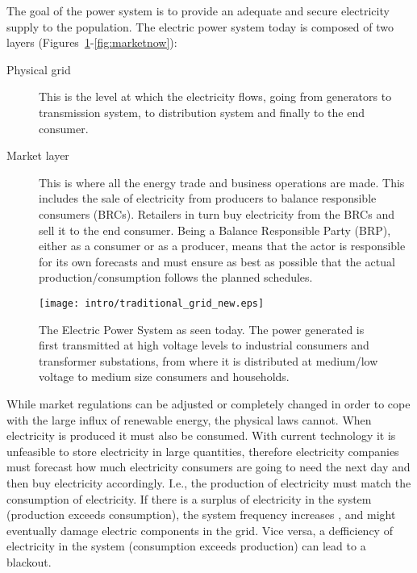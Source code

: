 The goal of the power system is to provide an adequate and secure electricity supply to the population.
The electric power system today is composed of two layers (Figures~\ref{fig:powernow}-\ref{fig:marketnow}): 
\begin{description}
	\item[Physical grid] This is the level at which the electricity flows, going from generators to transmission system, to distribution system and finally to the end consumer.
	\item[Market layer] This is where all the energy trade and business operations are made. This includes the sale of electricity from producers to balance responsible consumers (BRCs). Retailers in turn buy electricity from the BRCs and sell it to the end consumer. Being a Balance Responsible Party (BRP), either as a consumer or as a producer, means that the actor is responsible for its own forecasts and must ensure as best as possible that the actual production/consumption follows the planned schedules.
\end{description}

\begin{figure}[t]
	\centering
	\caption{The Electric Power System as seen today. The power generated is first transmitted at high voltage levels to industrial consumers and transformer substations, from where it is distributed at medium/low voltage to medium size consumers and households.}\label{fig:powernow}
	\texttt{[image: intro/traditional\_grid\_new.eps]}
\end{figure}

While market regulations can be adjusted or completely changed in order to cope with the large influx of renewable energy, the physical laws cannot.
When electricity is produced it must also be consumed. With current technology it is unfeasible to store electricity in large quantities, therefore electricity companies must forecast how much electricity consumers are going to need the next day and then buy electricity accordingly. I.e., the production of electricity must match the consumption of electricity. If there is a surplus of electricity in the system (production exceeds consumption), the system frequency increases%
, and might eventually damage electric components in the grid. Vice versa, a defficiency of electricity in the system (consumption exceeds production) can lead to a blackout. 

